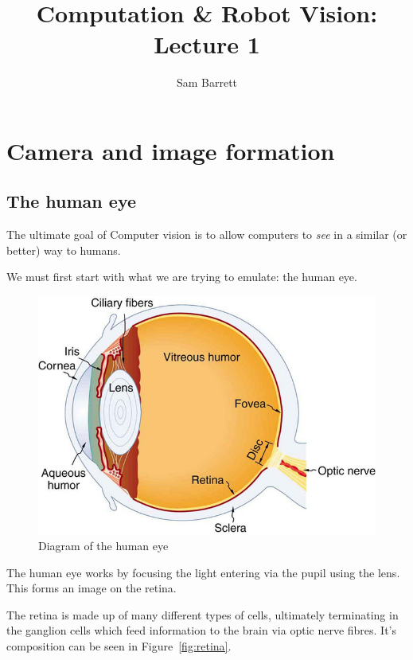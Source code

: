 \documentclass{article}
\title{Computation \& Robot Vision: Lecture 1}
\author{Sam Barrett}
\begin{document}
\maketitle

\section{Camera and image formation}
\label{sec:cif}

\subsection{The human eye}
\label{subsec:human-eye}

The ultimate goal of Computer vision is to allow computers to \textit{see} in a similar (or better) way to humans.

We must first start with what we are trying to emulate: the human eye.

\begin{figure}[ht]
  \centering
  \includegraphics[scale=0.5]{figures/human-eye.jpeg}
  \caption{\label{fig:human-eye} Diagram of the human eye}
\end{figure}

The human eye works by focusing the light entering via the pupil using the lens. This forms an image on the retina.

The retina is made up of many different types of cells, ultimately terminating in the ganglion cells which feed information to the brain via optic nerve fibres. It's composition can be seen in Figure~\ref{fig:retina}.
\end{document}
